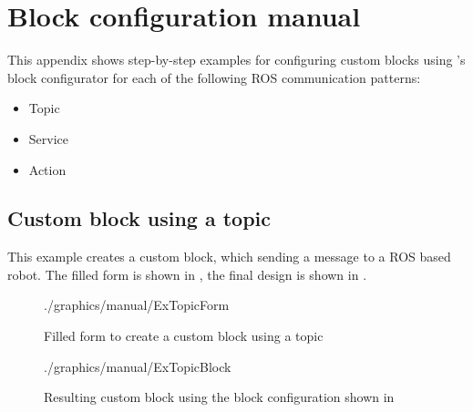 \chapter{Block configuration manual} \label{apx:BlockConfigManual}
This appendix shows step-by-step examples for configuring custom blocks using \toolname{}'s block configurator for each of the following ROS communication patterns:
\begin{itemize}
    \item Topic
    \item Service
    \item Action
\end{itemize}

\section*{Custom block using a topic}
This example creates a custom block, which sending a message to a ROS based robot. The filled form is shown in , the final design is shown in .

\begin{figure}[htbp]
	\centering
	\begin{overpic}[width=0.8\linewidth]{./graphics/manual/ExTopicForm}
	\end{overpic}
	\caption{Filled form to create a custom block using a topic}%
	\label{fig:ExTopicForm}%
\end{figure}

\begin{figure}[htbp]
	\centering
	\begin{overpic}[width=0.2\linewidth]{./graphics/manual/ExTopicBlock}
	\end{overpic}
	\caption{Resulting custom block using the block configuration shown in }%
	\label{fig:ExTopicBlock}%
\end{figure}
